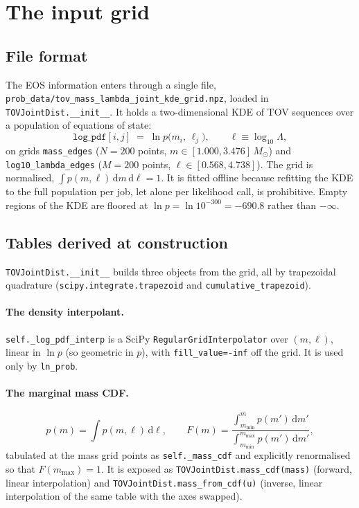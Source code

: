 \documentclass[11pt,a4paper]{article}
\newcommand{\dd}{\mathrm{d}}
\newcommand{\code}[1]{\texttt{#1}}
\begin{document}
\section{The input grid}
\label{sec:grid}

\subsection{File format}

The EOS information enters through a single file,
\code{prob\_data/tov\_mass\_lambda\_joint\_kde\_grid.npz}, loaded in
\code{TOVJointDist.\_\_init\_\_}. It holds a two-dimensional KDE of TOV
sequences over a population of equations of state:
\begin{equation}
  \code{log\_pdf}[i,j] \;=\; \ln p\big(m_i,\, \ell_j\big),
  \qquad \ell \equiv \log_{10}\Lambda ,
\end{equation}
on grids \code{mass\_edges} ($N=200$ points, $m \in [1.000, 3.476]\,M_\odot$)
and \code{log10\_lambda\_edges} ($M=200$ points, $\ell \in [0.568, 4.738]$). The
grid is normalised, $\int p(m,\ell)\,\dd m\,\dd\ell = 1$. It is fitted offline
because refitting the KDE to the full population per job, let alone per
likelihood call, is prohibitive. Empty regions of the KDE are floored at
$\ln p = \ln 10^{-300} = -690.8$ rather than $-\infty$.

\subsection{Tables derived at construction}
\label{sec:tables}

\code{TOVJointDist.\_\_init\_\_} builds three objects from the grid, all by
trapezoidal quadrature (\code{scipy.integrate.trapezoid} and
\code{cumulative\_trapezoid}).

\paragraph{The density interpolant.}
\code{self.\_log\_pdf\_interp} is a SciPy \code{RegularGridInterpolator}
over $(m, \ell)$, linear in $\ln p$ (so geometric in $p$), with
\code{fill\_value=-inf} off the grid. It is used only by \code{ln\_prob}.

\paragraph{The marginal mass CDF.}
\begin{equation}
  p(m) = \int p(m,\ell)\,\dd\ell,
  \qquad
  F(m) = \frac{\int_{m_{\min}}^{m} p(m')\,\dd m'}{\int_{m_{\min}}^{m_{\max}} p(m')\,\dd m'} ,
  \label{eq:massmarg}
\end{equation}
tabulated at the mass grid points as \code{self.\_mass\_cdf} and explicitly
renormalised so that $F(m_{\max}) = 1$. It is exposed as
\code{TOVJointDist.mass\_cdf(mass)} (forward, linear interpolation) and
\code{TOVJointDist.mass\_from\_cdf(u)} (inverse, linear interpolation of the
same table with the axes swapped).
\end{document}
